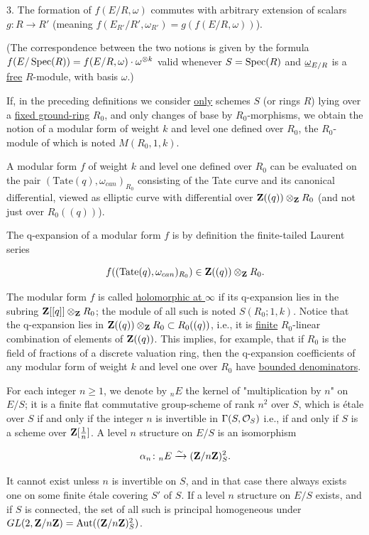 3. The formation of $f(E/R,\omega)$ commutes with arbitrary extension of
scalars $g\colon R\to R'$ (meaning $f(E_{R'}/R',\omega_{R'}) =
g(f(E/R,\omega))$).

(The correspondence between the two notions is given by the formula
$f(E/\operatorname{Spec}(R)) = f(E/R,\omega)\cdot\omega^{\otimes k}$ valid whenever
$S=\operatorname{Spec}(R)$ and $\underline{\omega}_{E/R}$ is a \uline{free} $R$-module, with basis $\omega$.)

If, in the preceding definitions we consider \uline{only} schemes $S$ (or
rings $R$) lying over a \uline{fixed ground-ring} $R_0$, and only changes of
base by $R_0$-morphisms, we obtain the notion of a modular form of weight $k$
and level one defined over $R_0$, the $R_0$-module of which is noted
$M(R_0,1,k)$.

A modular form $f$ of weight $k$ and level one defined over $R_0$ can be
evaluated on the pair $(\mathrm{Tate}(q),\omega_{can})_{R_0}$ consisting of the
Tate curve and its canonical differential, viewed as elliptic curve with
differential over $\mathbf{Z}((q))\otimes_{\mathbf{Z}} R_0$ (and not just over $R_0((q))$).

The q-expansion of a modular form $f$ is by definition the finite-tailed
Laurent series

\[
f((\mathrm{Tate}(q),\omega_{can})_{R_0})\in\mathbf{Z}((q))\otimes_{\mathbf{Z}} R_0.
\]

The modular form $f$ is called \uline{holomorphic at $\infty$} if its
q-expansion lies in the subring $\mathbf{Z}[[q]]\otimes_{\mathbf{Z}} R_0$; the module of all such
is noted $S(R_0;1,k)$. Notice that the q-expansion lies in
$\mathbf{Z}((q))\otimes_{\mathbf{Z}} R_0\subset R_0((q))$, i.e., it is \uline{finite}
$R_0$-linear combination of elements of $\mathbf{Z}((q))$. This implies, for example,
that if $R_0$ is the field of fractions of a discrete valuation ring, then the
q-expansion coefficients of any modular form of weight $k$ and level one over
$R_0$ have \uline{bounded denominators}.


For each integer $n\geq 1$, we denote by ${}_nE$ the kernel of "multiplication
by $n$" on $E/S$; it is a finite flat commutative group-scheme of rank $n^2$
over $S$, which is étale over $S$ if and only if the integer $n$ is invertible
in $\Gamma(S,\mathcal{O}_S)$ i.e., if and only if $S$ is a scheme over
$\mathbf{Z}[\frac{1}{n}]$. A level $n$ structure on $E/S$ is an isomorphism

\[
\alpha_n\colon {}_nE\xrightarrow{\sim}(\mathbf{Z}/n\mathbf{Z})^2_S.
\]

It cannot exist unless $n$ is invertible on $S$, and in that case there always
exists one on some finite étale covering $S'$ of $S$. If a level $n$ structure
on $E/S$ exists, and if $S$ is connected, the set of all such is principal
homogeneous under $GL(2,\mathbf{Z}/n\mathbf{Z}) = \operatorname{Aut}((\mathbf{Z}/n\mathbf{Z})^2_S)$.

